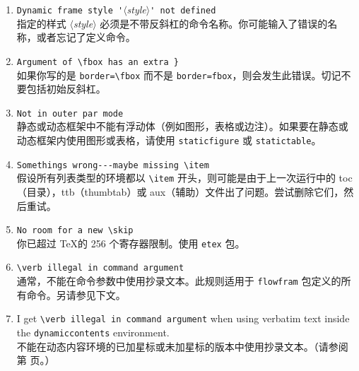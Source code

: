 \documentclass[a4paper]{book}%
\newcommand{\sty}[1]{\texttt{#1}}
\newcommand{\meta}[1]{\textnormal{\ensuremath{\langle}\makebox[0pt][l]{}\emph{#1}\makebox[0pt][l]{}\ensuremath{\rangle}}}
\newcommand{\cmd}[1]{\texttt{#1}}
\begin{document}
\begin{enumerate}
    \item \verb|Dynamic frame style '|\meta{style}\verb|' not defined|\\ 指定的样式 \meta{style} 必须是不带反斜杠的命令名称。你可能输入了错误的名称，或者忘记了定义命令。
    \item \verb|Argument of \fbox has an extra }|\\ 如果你写的是 \verb|border=\fbox| 而不是 \verb|border=fbox|，则会发生此错误。切记不要包括初始反斜杠。
    \item \verb|Not in outer par mode|\\ 静态或动态框架中不能有浮动体（例如图形，表格或边注）。如果要在静态或动态框架内使用图形或表格，请使用 \cmd{staticfigure} 或 \cmd{statictable}。
    \item \verb|Somethings wrong---maybe missing \item| \\ 假设所有列表类型的环境都以 \verb|\item| 开头，则可能是由于上一次运行中的 toc（目录），ttb（thumbtab）或 aux（辅助）文件出了问题。尝试删除它们，然后重试。
    \item \verb|No room for a new \skip|\\ 你已超过 \TeX 的 256 个寄存器限制。使用 \sty{etex} 包。
    \item \verb|\verb illegal in command argument|\\ 通常，不能在命令参数中使用抄录文本。此规则适用于 \sty{flowfram} 包定义的所有命令。另请参见下文。
    \item I get \verb|\verb illegal in command argument| when using verbatim text inside the \cmd{dynamiccontents} environment.\\ 不能在动态内容环境的已加星标或未加星标的版本中使用抄录文本。（请参阅第 \pageref{page-verbtext} 页。）
\end{enumerate}
\appendix
\end{document}
